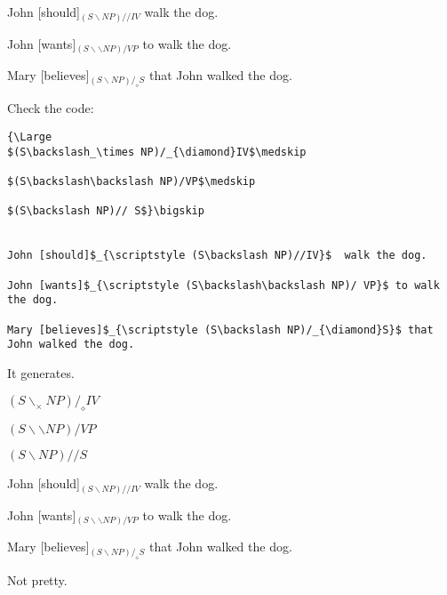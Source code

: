 \documentclass[11pt]{article}
\begin{document}
John [should]$_{\scriptstyle (S\backslash NP)//IV}$  walk the dog.

John [wants]$_{\scriptstyle (S\backslash\backslash NP)/ VP}$ to walk the dog.

Mary [believes]$_{\scriptstyle (S\backslash NP)/_{\diamond}S}$ that John walked the dog.
\newpage

Check the code:\footnotesize

\begin{verbatim}
{\Large 
$(S\backslash_\times NP)/_{\diamond}IV$\medskip

$(S\backslash\backslash NP)/VP$\medskip

$(S\backslash NP)// S$}\bigskip


John [should]$_{\scriptstyle (S\backslash NP)//IV}$  walk the dog.

John [wants]$_{\scriptstyle (S\backslash\backslash NP)/ VP}$ to walk the dog.

Mary [believes]$_{\scriptstyle (S\backslash NP)/_{\diamond}S}$ that John walked the dog.
\end{verbatim}\bigskip


\normalsize It generates. \bigskip

{\Large 
$(S\backslash_\times NP)/_{\diamond}IV$\medskip

$(S\backslash\backslash NP)/VP$\medskip

$(S\backslash NP)// S$}\bigskip


John [should]$_{\scriptstyle (S\backslash NP)//IV}$  walk the dog.

John [wants]$_{\scriptstyle (S\backslash\backslash NP)/ VP}$ to walk the dog.

Mary [believes]$_{\scriptstyle (S\backslash NP)/_{\diamond}S}$ that John walked the dog.\bigskip\bigskip

Not pretty.
\end{document}
